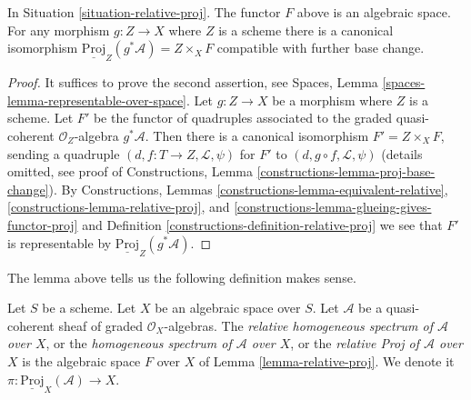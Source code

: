 \begin{lemma}
\label{lemma-relative-proj}
In Situation \ref{situation-relative-proj}. The functor $F$ above is an
algebraic space. For any morphism $g : Z \to X$ where $Z$ is a scheme
there is a canonical isomorphism
$\underline{\text{Proj}}_Z(g^*\mathcal{A}) = Z \times_X F$
compatible with further base change.
\end{lemma}

\begin{proof}
It suffices to prove the second assertion, see
Spaces, Lemma \ref{spaces-lemma-representable-over-space}.
Let $g : Z \to X$ be a morphism where $Z$ is a scheme.
Let $F'$ be the functor of quadruples associated
to the graded quasi-coherent $\mathcal{O}_Z$-algebra $g^*\mathcal{A}$.
Then there is a canonical isomorphism $F' = Z \times_X F$, sending
a quadruple $(d, f : T \to Z, \mathcal{L}, \psi)$ for $F'$
to $(d, g \circ f, \mathcal{L}, \psi)$ (details omitted, see proof of
Constructions, Lemma \ref{constructions-lemma-proj-base-change}).
By Constructions, Lemmas
\ref{constructions-lemma-equivalent-relative},
\ref{constructions-lemma-relative-proj}, and
\ref{constructions-lemma-glueing-gives-functor-proj} and
Definition \ref{constructions-definition-relative-proj}
we see that $F'$ is representable by
$\underline{\text{Proj}}_Z(g^*\mathcal{A})$.
\end{proof}

\noindent
The lemma above tells us the following definition makes sense.

\begin{definition}
\label{definition-relative-proj}
Let $S$ be a scheme. Let $X$ be an algebraic space over $S$.
Let $\mathcal{A}$ be a quasi-coherent sheaf of
graded $\mathcal{O}_X$-algebras. The
{\it relative homogeneous spectrum of $\mathcal{A}$ over $X$},
or the {\it homogeneous spectrum of $\mathcal{A}$ over $X$}, or the
{\it relative Proj of $\mathcal{A}$ over $X$} is the algebraic space
$F$ over $X$ of Lemma \ref{lemma-relative-proj}.
We denote it $\pi : \underline{\text{Proj}}_X(\mathcal{A}) \to X$.
\end{definition}

